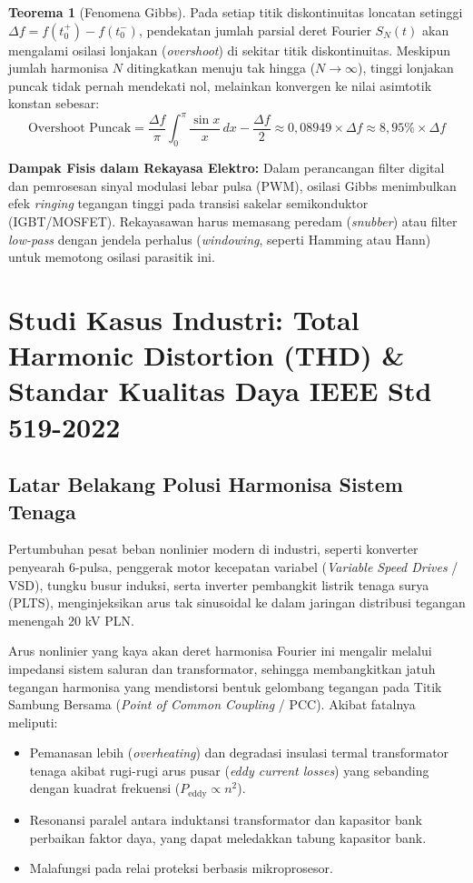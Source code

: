 \documentclass[11pt,a4paper]{article}
\theoremstyle{definition}
\newtheorem{theorem}{Teorema}[section]
\begin{document}
\begin{theorem}[Fenomena Gibbs]
Pada setiap titik diskontinuitas loncatan setinggi $\Delta f = f(t_0^+) - f(t_0^-)$, pendekatan jumlah parsial deret Fourier $S_N(t)$ akan mengalami osilasi lonjakan (\textit{overshoot}) di sekitar titik diskontinuitas. Meskipun jumlah harmonisa $N$ ditingkatkan menuju tak hingga ($N \to \infty$), tinggi lonjakan puncak tidak pernah mendekati nol, melainkan konvergen ke nilai asimtotik konstan sebesar:
\begin{equation}
    \text{Overshoot Puncak} = \frac{\Delta f}{\pi} \int_{0}^{\pi} \frac{\sin x}{x} \, dx - \frac{\Delta f}{2} \approx 0{,}08949 \times \Delta f \approx 8{,}95\% \times \Delta f
    \label{eq:gibbs_formula}
\end{equation}
\end{theorem}

\textbf{Dampak Fisis dalam Rekayasa Elektro:}
Dalam perancangan filter digital dan pemrosesan sinyal modulasi lebar pulsa (PWM), osilasi Gibbs menimbulkan efek \textit{ringing} tegangan tinggi pada transisi sakelar semikonduktor (IGBT/MOSFET). Rekayasawan harus memasang peredam (\textit{snubber}) atau filter \textit{low-pass} dengan jendela perhalus (\textit{windowing}, seperti Hamming atau Hann) untuk memotong osilasi parasitik ini.

\section{Studi Kasus Industri: Total Harmonic Distortion (THD) \& Standar Kualitas Daya IEEE Std 519-2022}

\subsection{Latar Belakang Polusi Harmonisa Sistem Tenaga}
Pertumbuhan pesat beban nonlinier modern di industri, seperti konverter penyearah 6-pulsa, penggerak motor kecepatan variabel (\textit{Variable Speed Drives} / VSD), tungku busur induksi, serta inverter pembangkit listrik tenaga surya (PLTS), menginjeksikan arus tak sinusoidal ke dalam jaringan distribusi tegangan menengah 20 kV PLN.

Arus nonlinier yang kaya akan deret harmonisa Fourier ini mengalir melalui impedansi sistem saluran dan transformator, sehingga membangkitkan jatuh tegangan harmonisa yang mendistorsi bentuk gelombang tegangan pada Titik Sambung Bersama (\textit{Point of Common Coupling} / PCC). Akibat fatalnya meliputi:
\begin{itemize}[leftmargin=*]
    \item Pemanasan lebih (\textit{overheating}) dan degradasi insulasi termal transformator tenaga akibat rugi-rugi arus pusar (\textit{eddy current losses}) yang sebanding dengan kuadrat frekuensi ($P_{\text{eddy}} \propto n^2$).
    \item Resonansi paralel antara induktansi transformator dan kapasitor bank perbaikan faktor daya, yang dapat meledakkan tabung kapasitor bank.
    \item Malafungsi pada relai proteksi berbasis mikroprosesor.
\end{itemize}
\end{document}
